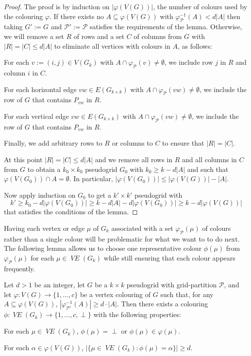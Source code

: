 \documentclass{patmorin}
\DeclareMathOperator{\VE}{\mathit{VE}}
\begin{document}
\begin{proof}
  The proof is by induction on $|\varphi(V(G))|$, the number of colours used by the colouring $\varphi$.  If there exists no $A\subseteq \varphi(V(G))$ with $\varphi_{\mathcal{P}}^{-1}(A) < d|A|$ then taking $G':=G$ and $\mathcal{P}':=\mathcal{P}$ satisfies the requirements of the lemma. Otherwise, we will remove a set $R$ of rows and a set $C$ of columns from $G$ with $|R|=|C|\le d|A|$ to eliminate all vertices with colours in $A$, as follows:
  \begin{compactitem}
    \item For each $v:=(i,j)\in V(G_{k})$ with $A\cap\varphi_\mathcal{P}(v)\neq\emptyset$, we include row $j$ in $R$ and column $i$ in $C$.
    \item For each horizontal edge $vw\in E(G_{k\times k})$ with $A\cap\varphi_\mathcal{P}(vw)\neq\emptyset$, we include the row of $G$ that contains $P_{vw}$ in $R$.
    \item For each vertical edge $vw\in E(G_{k\times k})$ with $A\cap\varphi_\mathcal{P}(vw)\neq\emptyset$, we include the row of $G$ that contains $P_{vw}$ in $R$.
    \item Finally, we add arbitrary rows to $R$ or columns to $C$ to ensure that $|R|=|C|$.
  \end{compactitem}
  At this point $|R|=|C|\le d|A|$ and we remove all rows in $R$ and all columns in $C$ from $G$ to obtain a $k_0\times k_0$ pseudogrid $G_0$ with $k_0\ge k-d|A|$ and such that $\varphi(V(G_0))\cap A=\emptyset$.  In particular, $|\varphi(V(G_0))|\le |\varphi(V(G))|-|A|$.

  Now apply induction on $G_0$ to get a $k'\times k'$ pseudogrid with
  \[  k'\ge k_0-d|\varphi(V(G_0))|  \ge k-d|A|-d|\varphi(V(G_0))|\ge k - d|\varphi(V(G))|
  \]
  that satisfies the conditions of the lemma.
\end{proof}

Having each vertex or edge $\mu$ of $G_k$ associated with a set $\varphi_\mathcal{P}(\mu)$ of colours rather than a single colour will be problematic for what we want to to do next.  The following lemma allows us to choose one representative colour $\phi(\mu)$ from $\varphi_{\mathcal{P}}(\mu)$ for each $\mu\in \VE(G_k)$ while still ensuring that each colour appears frequently.

\begin{lem}\label{one_colour_per_object}
  Let $d>1$ be an integer, let $G$ be a $k\times k$ pseudogrid with grid-partition $\mathcal{P}$, and let $\varphi:V(G)\to\{1,\ldots,c\}$ be a vertex colouring of $G$ such that, for any $A\subseteq\varphi(V(G))$, $|\varphi_{\mathcal{P}'}^{-1}(A)| \ge d\cdot|A|$. Then there exists a colouring $\phi:\VE(G_{k})\to\{1,\ldots,c,\perp\}$ with the following properties:
  \begin{compactenum}[(i)]
    \item For each $\mu\in\VE(G_{k})$, $\phi(\mu)=\perp$ or $\phi(\mu)\in\varphi(\mu)$.
    \item For each $\alpha\in\varphi(V(G))$, $|\{\mu\in\VE(G_{k}):\phi(\mu)=\alpha\}|\ge d$.
  \end{compactenum}
\end{lem}
\end{document}
